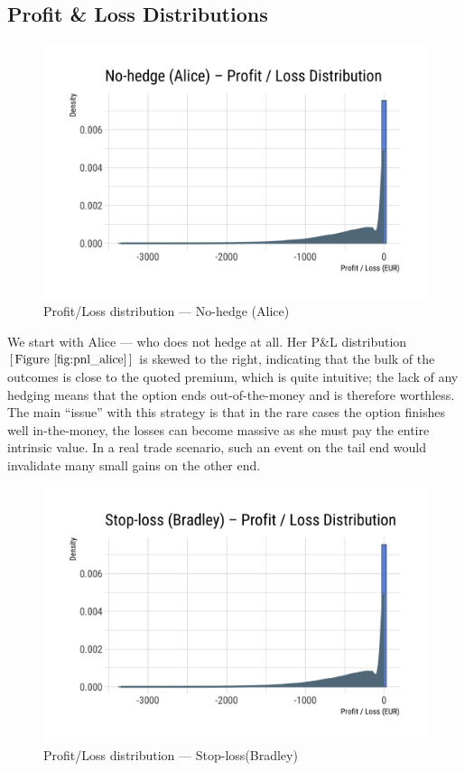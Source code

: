 \documentclass[11pt,a4paper]{article}
\begin{document}
\subsection{Profit \& Loss Distributions}

\begin{figure}[H]
	\centering
	\includegraphics[width=0.85\linewidth]{figures/pnl_alice.png}
	\caption{Profit/Loss distribution — No-hedge (Alice)}
	\label{fig:pnl_alice}
\end{figure}

We start with Alice — who does not hedge at all. Her P\&L distribution \([\,\text{Figure~\ref{fig:pnl_alice}}\,]\) is skewed to the right, indicating that the bulk of the outcomes is close to the quoted premium, which is quite intuitive; the lack of any hedging means that the option ends out-of-the-money and is therefore worthless. The main ``issue'' with this strategy is that in the rare cases the option finishes well in-the-money, the losses can become massive as she must pay the entire intrinsic value. In a real trade scenario, such an event on the tail end would invalidate many small gains on the other end.

\begin{figure}[H]
	\centering
	\includegraphics[width=0.85\linewidth]{figures/pnl_bradley.png}
	\caption{Profit/Loss distribution — Stop-loss(Bradley)}
	\label{fig:pnl_bradley}
\end{figure}
\end{document}

